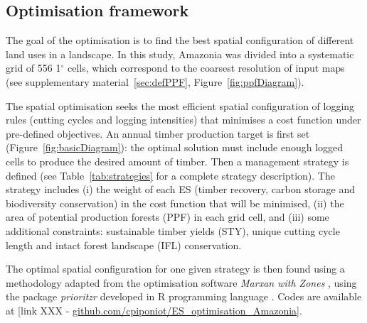 \documentclass{article}
\begin{document}
\subsection{Optimisation framework}

The goal of the optimisation is to find the best spatial configuration of different land uses in a landscape. In this study, Amazonia was divided into a systematic grid of 556 1$^{\circ}$ cells, which correspond to the coarsest resolution of input maps (see supplementary material~\ref{sec:defPPF}, Figure~\ref{fig:ppfDiagram}). 

The spatial optimisation seeks the most efficient spatial configuration of logging rules (cutting cycles and logging intensities) that minimises a cost function under pre-defined objectives. An annual timber production target is first set (Figure~\ref{fig:basicDiagram}): the optimal solution must include enough logged cells to produce the desired amount of timber. Then a management strategy is defined (see Table~\ref{tab:strategies} for a complete strategy description). The strategy includes (i) the weight of each ES (timber recovery, carbon storage and biodiversity conservation) in the cost function that will be minimised, (ii) the area of potential production forests (PPF) in each grid cell, and (iii) some additional constraints: sustainable timber yields (STY), unique cutting cycle length and intact forest landscape (IFL) conservation. 

The optimal spatial configuration for one given strategy is then found using a methodology adapted from the optimisation software \textit{Marxan with Zones} \cite{Watts2009}, using the package \textit{prioritzr} \cite{Hanson2018} developed in R programming language \cite{RCoreTeam2017}. Codes are available at [link XXX - \url{github.com/cpiponiot/ES_optimisation_Amazonia}]. 
\end{document}
